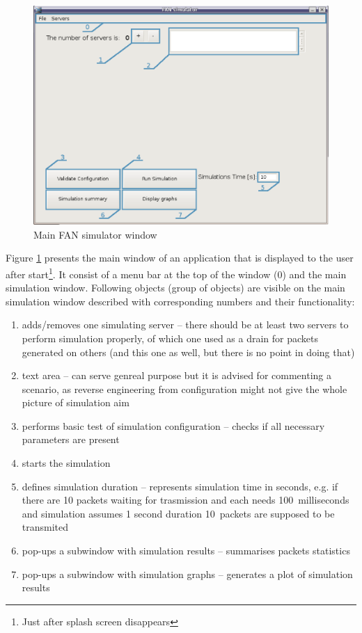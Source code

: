 \documentclass[a4paper,12pt]{article}
\begin{document}
	\begin{figure}[h]
	\includegraphics[width=150mm]{man/MainWindow.eps}
	\caption{Main FAN simulator window}
	\label{MAINWINDOW}
	\end{figure}

	Figure \ref{MAINWINDOW} presents the main window of an application that is
	displayed to the user after start\footnote{Just after splash screen disappears}. It
	consist of a menu bar at the top of the window (0) and the main 
	simulation window. Following objects (group of objects) are visible on the main
	simulation window described with corresponding numbers and their functionality:
	\begin{enumerate}
	\item {adds/removes one simulating server -- there should be at least two
	servers to perform simulation properly, of which one used as a drain for
	packets generated on others (and this one as well, but there is no point in
	doing that)}
	\item {text area -- can serve genreal purpose but it is advised for commenting
	a scenario, as reverse engineering from configuration might not give the whole
	picture of simulation aim}
	\item {performs basic test of simulation configuration -- checks if all
	necessary parameters are present}
	\item {starts the simulation}
	\item {defines simulation duration -- represents simulation time in seconds,
	e.g. if there are 10 packets waiting for trasmission and each needs
	100~milliseconds and simulation assumes 1 second duration 10~packets are
	supposed to be transmited }
	\item {pop-ups a subwindow with simulation results -- summarises packets
	statistics}
	\item {pop-ups a subwindow with simulation graphs -- generates a plot
	of simulation results}
    \end{enumerate}
    
\end{document}
